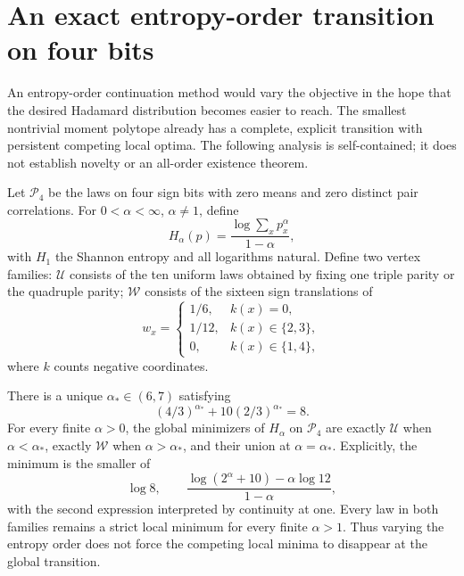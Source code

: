 \section{An exact entropy-order transition on four bits}
\label{sec:renyi-phase}
An entropy-order continuation method would vary the objective in the
hope that the desired Hadamard distribution becomes easier to reach.
The smallest nontrivial moment polytope already has a complete,
explicit transition with persistent competing local optima. The
following analysis is self-contained; it does not establish novelty
or an all-order existence theorem.

Let $\mathcal P_4$ be the laws on four sign bits with zero means and
zero distinct pair correlations. For $0<\alpha<\infty$, $\alpha\ne1$,
define
\[
 H_\alpha(p)=\frac{\log\sum_xp_x^\alpha}{1-\alpha},
\]
with $H_1$ the Shannon entropy and all logarithms natural.
Define two vertex families: $\mathcal U$ consists of the ten uniform
laws obtained by fixing one triple parity or the quadruple parity;
$\mathcal W$ consists of the sixteen sign translations of
\[
 w_x=\begin{cases}
 1/6,&k(x)=0,\\
 1/12,&k(x)\in\{2,3\},\\
 0,&k(x)\in\{1,4\},
 \end{cases}
\]
where $k$ counts negative coordinates.

\begin{theorem}\label{thm:renyi-phase}
There is a unique $\alpha_*\in(6,7)$ satisfying
\[
 (4/3)^{\alpha_*}+10(2/3)^{\alpha_*}=8.
\]
For every finite $\alpha>0$, the global minimizers of $H_\alpha$ on
$\mathcal P_4$ are exactly $\mathcal U$ when $\alpha<\alpha_*$,
exactly $\mathcal W$ when $\alpha>\alpha_*$, and their union at
$\alpha=\alpha_*$. Explicitly, the minimum is the smaller of
\[
 \log8,\qquad
 \frac{\log(2^\alpha+10)-\alpha\log12}{1-\alpha},
\]
with the second expression interpreted by continuity at one.
Every law in both families remains a strict local minimum for every
finite $\alpha>1$. Thus varying the entropy order does not force
the competing local minima to disappear at the global transition.
\end{theorem}

